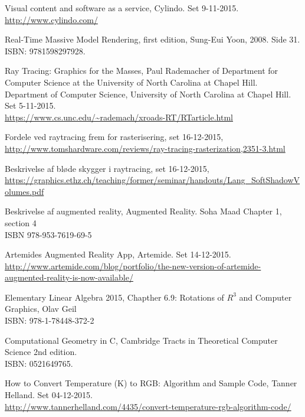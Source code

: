 \begin{thebibliography}{99}
  Visual content and software as a service,
  Cylindo.
  Set 9-11-2015.\\
  \url{http://www.cylindo.com/}
  
  Real-Time Massive Model Rendering, first edition, 
  Sung-Eui Yoon, 2008. Side 31. \\
  ISBN: 9781598297928.

  Ray Tracing: Graphics for the Masses, 
  Paul Rademacher of Department for Computer Science at the University of North Carolina at Chapel Hill.
  Department of Computer Science, University of North Carolina at Chapel Hill.
  Set 5-11-2015.\\
  \url{https://www.cs.unc.edu/~rademach/xroads-RT/RTarticle.html}

  Fordele ved raytracing frem for rasterisering, set 16-12-2015,\\
  \url{http://www.tomshardware.com/reviews/ray-tracing-rasterization,2351-3.html}

  Beskrivelse af bløde skygger i raytracing, set 16-12-2015,\\
  \url{https://graphics.ethz.ch/teaching/former/seminar/handouts/Lang_SoftShadowVolumes.pdf}
  
  Beskrivelse af augmented reality,
  Augmented Reality.
  Soha Maad
  Chapter 1, section 4\\
  ISBN 978-953-7619-69-5

  Artemides Augmented Reality App, 
  Artemide.
  Set 14-12-2015.\\
  \url{http://www.artemide.com/blog/portfolio/the-new-version-of-artemide-augmented-reality-is-now-available/}

  Elementary Linear Algebra 2015, Chapther 6.9: Rotations of $R^{3}$ and Computer Graphics, Olav Geil\\
  ISBN: 978-1-78448-372-2


  Computational Geometry in C,
  Cambridge Tracts in Theoretical Computer Science 2nd edition. \\
  ISBN: 0521649765.

  How to Convert Temperature (K) to RGB: Algorithm and   Sample Code,
  Tanner Helland.
  Set 04-12-2015.\\
  \url{http://www.tannerhelland.com/4435/convert-temperature-rgb-algorithm-code/}
  

\end{thebibliography}
